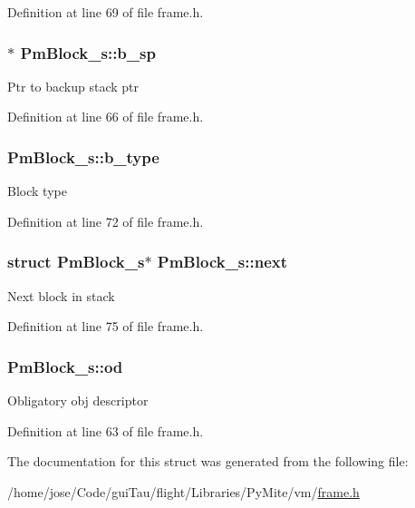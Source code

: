 Definition at line 69 of file frame.\-h.

\hypertarget{struct_pm_block__s_aac9e69c5a2cbde6bc97bdf08fb8ea529}{
\subsubsection[{b\-\_\-sp}]{$\ast$ Pm\-Block\-\_\-s\-::b\-\_\-sp}}\label{struct_pm_block__s_aac9e69c5a2cbde6bc97bdf08fb8ea529}
Ptr to backup stack ptr 

Definition at line 66 of file frame.\-h.

\hypertarget{struct_pm_block__s_a9b5a5f848eac48f04f642ca6b1eedb75}{
\subsubsection[{b\-\_\-type}]{ Pm\-Block\-\_\-s\-::b\-\_\-type}}\label{struct_pm_block__s_a9b5a5f848eac48f04f642ca6b1eedb75}
Block type 

Definition at line 72 of file frame.\-h.

\hypertarget{struct_pm_block__s_a7f01b85ab24c835cf8c953a7b8767f6c}{
\subsubsection[{next}]{\setlength{\rightskip}{0pt plus 5cm}struct {\bf Pm\-Block\-\_\-s}$\ast$ Pm\-Block\-\_\-s\-::next}}\label{struct_pm_block__s_a7f01b85ab24c835cf8c953a7b8767f6c}
Next block in stack 

Definition at line 75 of file frame.\-h.

\hypertarget{struct_pm_block__s_a6af1b8ef7cc84f8b059fae997d53ca83}{
\subsubsection[{od}]{ Pm\-Block\-\_\-s\-::od}}\label{struct_pm_block__s_a6af1b8ef7cc84f8b059fae997d53ca83}
Obligatory obj descriptor 

Definition at line 63 of file frame.\-h.



The documentation for this struct was generated from the following file\-:\begin{DoxyCompactItemize}
\item 
/home/jose/\-Code/gui\-Tau/flight/\-Libraries/\-Py\-Mite/vm/\hyperlink{frame_8h}{frame.\-h}\end{DoxyCompactItemize}
